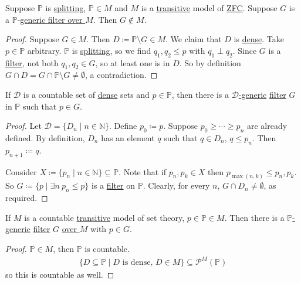 \documentclass{article}
\newcommand{\named}[1]{\textbf{#1}\index{#1}}
\newcommand{\1}{\mathbbm{1}}
\begin{document}
\begin{lemma}
  Suppose $\mathbb{P}$ is \hyperlink{def:splitting}{splitting}, $\mathbb{P} \in M$ and $M$ is a \hyperlink{def:transitive}{transitive} model of \hyperlink{def:axioms}{\textsf{ZFC}}.
  Suppose $G$ is a $\mathbb{P}$-\hyperlink{def:genericO}{generic filter over $M$}. Then $G \notin M$.
\end{lemma}
\begin{proof}
  Suppose $G \in M$. Then $D \coloneqq \mathbb{P} \setminus G \in M$. We claim that $D$ is \hyperlink{def:dense}{dense}.
  Take $p \in \mathbb{P}$ arbitrary. $\mathbb{P}$ is \hyperlink{def:splitting}{splitting}, so we find $q_1,q_2 \leq p$ with $q_1 \perp q_2$.
  Since $G$ is a \hyperlink{def:filter}{filter}, not both $q_1, q_2 \in G$, so at least one is in $D$.
  So by definition $G \cap D = G \cap \mathbb{P} \setminus G \neq \emptyset$, a contradiction.
\end{proof}
\begin{lemma}
  \newlec
  If $\mathcal{D}$ is a countable set of \hyperlink{def:dense}{dense} sets and $p \in \mathbb{P}$, then there is a \hyperlink{def:dgeneric}{$\mathcal{D}$-generic} \hyperlink{def:filter}{filter} $G$ in $\mathbb{P}$ such that $p \in G$.
\end{lemma}
\begin{proof}
  Let $\mathcal{D} = \{D_n \mid n \in \mathbb{N}\}$.
  Define $p_0 \coloneqq p$. Suppose $p_0 \geq \dotsb \geq p_n$ are already defined.
  By definition, $D_n$ has an element $q$ such that $q \in D_n$, $q \leq p_n$. Then $p_{n+1} \coloneqq q$.

  Consider $X \coloneqq \{p_n \mid n \in \mathbb{N}\} \subseteq \mathbb{P}$.
  Note that if $p_n, p_k \in X$ then $p_{\max(n,k)} \leq p_n,p_k$.
  So $G \coloneqq \{p \mid \exists n \ p_n \leq p\}$ is a \hyperlink{def:filter}{filter} on $\mathbb{P}$.
  Clearly, for every $n$, $G \cap D_n \neq \emptyset$, as required.
\end{proof}
\begin{cor}
  If $M$ is a countable \hyperlink{def:transitive}{transitive} model of set theory, $p \in \mathbb{P} \in M$.
  Then there is a \hyperlink{def:dgeneric}{$\mathbb{P}$-generic} \hyperlink{def:filter}{filter} $G$ \hyperlink{def:genericO}{over $M$} with $p \in G$.
\end{cor}
\begin{proof}
  $\mathbb{P} \in M$, then $\mathbb{P}$ is countable.
  \begin{align*}
    \{D \subseteq \mathbb{P} \mid D \text{ is dense, } D \in M\} \subseteq \mathcal{P}^M(\mathbb{P})
  \end{align*}
  so this is countable as well.
\end{proof}
\end{document}
